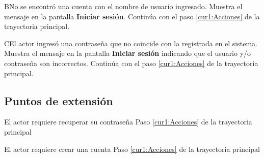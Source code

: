  \begin{UCtrayectoriaA}{B}{No se encontró una cuenta con el nombre de usuario ingresado.}
    \UCpaso[\UCsist] Muestra el mensaje  en la pantalla \textbf{Iniciar sesión}.
    \UCpaso[] Continúa con el paso \ref{cur1:Acciones} de la trayectoria principal.
 \end{UCtrayectoriaA}
 
 \begin{UCtrayectoriaA}{C}{El actor ingresó una contraseña que no coincide con la registrada en el sistema.}
    \UCpaso[\UCsist] Muestra el mensaje  en la pantalla \textbf{Iniciar sesión} indicando que el usuario y/o contraseña son incorrectos.
    \UCpaso[] Continúa con el paso \ref{cur1:Acciones} de la trayectoria principal.
 \end{UCtrayectoriaA} 


 
\subsection{Puntos de extensión}

\UCExtensionPoint
{El actor requiere recuperar su contraseña}
{ Paso \ref{cur1:Acciones} de la trayectoria principal}
{}

\UCExtensionPoint
{El actor requiere crear una cuenta}
{ Paso \ref{cur1:Acciones} de la trayectoria principal}
{}
 

